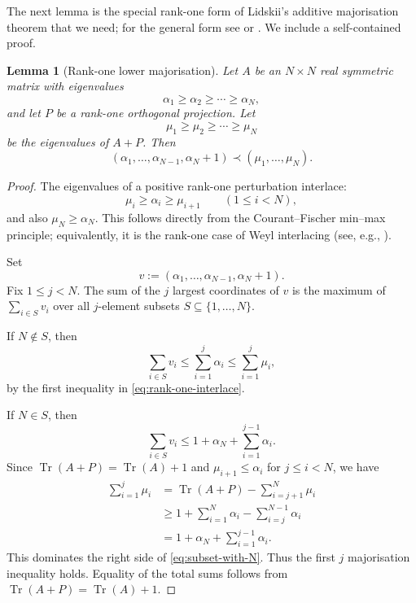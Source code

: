 \documentclass[11pt]{article}
\newtheorem{lemma}[theorem]{Lemma}
\theoremstyle{definition}
\theoremstyle{remark}
\newcommand{\tr}{\operatorname{Tr}}
\begin{document}
The next lemma is the special rank-one form of Lidskii's additive
majorisation theorem that we need; for the general form see
\cite[Chapter~III]{Bhatia} or \cite[Chapter~9]{MOA}.  We include a
self-contained proof.

\begin{lemma}[Rank-one lower majorisation]
  \label{lem:rank-one-majorization}
  Let $A$ be an $N\times N$ real symmetric matrix with eigenvalues
  \[
    \alpha_1\ge\alpha_2\ge\cdots\ge\alpha_N,
  \]
  and let $P$ be a rank-one orthogonal projection.  Let
  \[
    \mu_1\ge\mu_2\ge\cdots\ge\mu_N
  \]
  be the eigenvalues of $A+P$.  Then
  \begin{equation}
    (\alpha_1,\ldots,\alpha_{N-1},\alpha_N+1)
    \prec
    (\mu_1,\ldots,\mu_N).
    \label{eq:rank-one-majorization}
  \end{equation}
\end{lemma}

\begin{proof}
  The eigenvalues of a positive rank-one perturbation interlace:
  \begin{equation}
    \mu_i\ge\alpha_i\ge\mu_{i+1}
    \qquad(1\le i<N),
    \label{eq:rank-one-interlace}
  \end{equation}
  and also $\mu_N\ge\alpha_N$.  This follows directly from the
  Courant--Fischer min--max principle; equivalently, it is the rank-one case of
  Weyl interlacing (see, e.g., \cite[Chapter~III]{Bhatia}).

  Set
  \[
    v:=(\alpha_1,\ldots,\alpha_{N-1},\alpha_N+1).
  \]
  Fix $1\le j<N$.  The sum of the $j$ largest coordinates of $v$ is the
  maximum of $\sum_{i\in S}v_i$ over all $j$-element subsets
  $S\subseteq\{1,\ldots,N\}$.

  If $N\notin S$, then
  \[
    \sum_{i\in S}v_i
    \le\sum_{i=1}^j\alpha_i
    \le\sum_{i=1}^j\mu_i,
  \]
  by the first inequality in \eqref{eq:rank-one-interlace}.

  If $N\in S$, then
  \begin{equation}
    \sum_{i\in S}v_i
    \le
    1+\alpha_N+\sum_{i=1}^{j-1}\alpha_i.
    \label{eq:subset-with-N}
  \end{equation}
  Since $\tr(A+P)=\tr(A)+1$ and
  $\mu_{i+1}\le\alpha_i$ for $j\le i<N$, we have
  \begin{align*}
    \sum_{i=1}^j\mu_i
    &=
    \tr(A+P)-\sum_{i=j+1}^N\mu_i\\
    &\ge
    1+\sum_{i=1}^N\alpha_i-
    \sum_{i=j}^{N-1}\alpha_i\\
    &=
    1+\alpha_N+\sum_{i=1}^{j-1}\alpha_i.
  \end{align*}
  This dominates the right side of \eqref{eq:subset-with-N}.  Thus the first
  $j$ majorisation inequality holds.  Equality of the total sums follows from
  $\tr(A+P)=\tr(A)+1$.
\end{proof}
\end{document}
